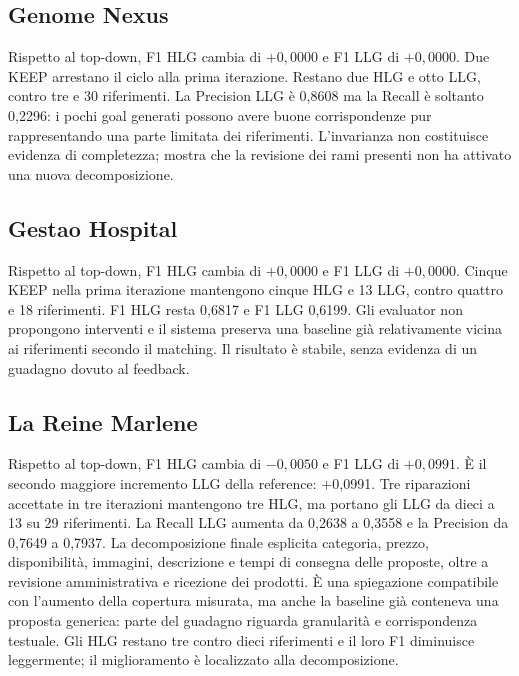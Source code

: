 \subsection{Genome Nexus}
Rispetto al top-down, F1 HLG cambia di $+0,0000$ e F1 LLG di $+0,0000$. Due KEEP arrestano il ciclo alla prima iterazione. Restano due HLG e otto LLG, contro tre e 30 riferimenti. La Precision LLG è 0,8608 ma la Recall è soltanto 0,2296: i pochi goal generati possono avere buone corrispondenze pur rappresentando una parte limitata dei riferimenti. L'invarianza non costituisce evidenza di completezza; mostra che la revisione dei rami presenti non ha attivato una nuova decomposizione.

\subsection{Gestao Hospital}
Rispetto al top-down, F1 HLG cambia di $+0,0000$ e F1 LLG di $+0,0000$. Cinque KEEP nella prima iterazione mantengono cinque HLG e 13 LLG, contro quattro e 18 riferimenti. F1 HLG resta 0,6817 e F1 LLG 0,6199. Gli evaluator non propongono interventi e il sistema preserva una baseline già relativamente vicina ai riferimenti secondo il matching. Il risultato è stabile, senza evidenza di un guadagno dovuto al feedback.

\subsection{La Reine Marlene}
Rispetto al top-down, F1 HLG cambia di $-0,0050$ e F1 LLG di $+0,0991$. È il secondo maggiore incremento LLG della reference: +0,0991. Tre riparazioni accettate in tre iterazioni mantengono tre HLG, ma portano gli LLG da dieci a 13 su 29 riferimenti. La Recall LLG aumenta da 0,2638 a 0,3558 e la Precision da 0,7649 a 0,7937. La decomposizione finale esplicita categoria, prezzo, disponibilità, immagini, descrizione e tempi di consegna delle proposte, oltre a revisione amministrativa e ricezione dei prodotti. È una spiegazione compatibile con l'aumento della copertura misurata, ma anche la baseline già conteneva una proposta generica: parte del guadagno riguarda granularità e corrispondenza testuale. Gli HLG restano tre contro dieci riferimenti e il loro F1 diminuisce leggermente; il miglioramento è localizzato alla decomposizione.

